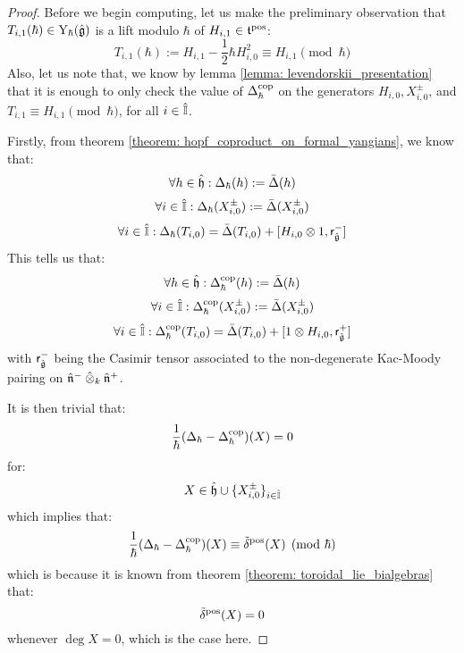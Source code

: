            \begin{proof}
                Before we begin computing, let us make the preliminary observation that $T_{i, 1}(\hbar) \in \mathrm{Y}_{\hbar}(\hat{\mathfrak{g}})$ is a lift modulo $\hbar$ of $H_{i, 1} \in \mathfrak{t}^{\mathrm{pos}}$:
                    $$T_{i, 1}(\hbar) := H_{i, 1} - \frac12 \hbar H_{i, 0}^2 \equiv H_{i, 1} \pmod{\hbar}$$
                Also, let us note that, we know by lemma \ref{lemma: levendorskii_presentation} that it is enough to only check the value of $\Delta_{\hbar}^{\mathrm{cop}}$ on the generators $H_{i, 0}, X_{i, 0}^{\pm}$, and $T_{i, 1} \equiv H_{i, 1} \pmod{\hbar}$, for all $i \in \hat{\mathbb{I}}$.
            
                Firstly, from theorem \ref{theorem: hopf_coproduct_on_formal_yangians}, we know that:
                    $$\forall h \in \hat{\mathfrak{h}}: \Delta_{\hbar}(h) := \bar{\Delta}(h)$$
                    $$\forall i \in \hat{\mathbb{I}}: \Delta_{\hbar}(X_{i, 0}^{\pm}) := \bar{\Delta}(X_{i, 0}^{\pm})$$
                    $$\forall i \in \hat{\simpleroots}: \Delta_{\hbar}(T_{i, 0}) = \bar{\Delta}(T_{i, 0}) + [H_{i, 0} \tensor 1, \sfr_{ \hat{\g} }^-]$$
                This tells us that:
                    $$\forall h \in \hat{\mathfrak{h}}: \Delta_{\hbar}^{\mathrm{cop}}(h) := \bar{\Delta}(h)$$
                    $$\forall i \in \hat{\mathbb{I}}: \Delta_{\hbar}^{\mathrm{cop}}(X_{i, 0}^{\pm}) := \bar{\Delta}(X_{i, 0}^{\pm})$$
                    $$\forall i \in \hat{\simpleroots}: \Delta_{\hbar}^{\cop}(T_{i, 0}) = \bar{\Delta}(T_{i, 0}) + [1 \tensor H_{i, 0}, \sfr_{ \hat{\g} }^+]$$
                with $\mathsf{r}_{\hat{\mathfrak{g}}}^-$ being the Casimir tensor associated to the non-degenerate Kac-Moody pairing on $\hat{\n}^- \hattensor_k \hat{\n}^+$.

                It is then trivial that:
                    $$\frac{1}{\hbar}( \Delta_{\hbar} - \Delta_{\hbar}^{\mathrm{cop}} )(X) = 0$$
                for:
                    $$X \in \hat{\mathfrak{h}} \cup \{X_{i, 0}^{\pm}\}_{i \in \hat{\mathbb{I}}}$$
                which implies that:
                    $$\frac{1}{\hbar}( \Delta_{\hbar} - \Delta_{\hbar}^{\mathrm{cop}} )(X) \equiv \tilde{\delta}^{\mathrm{pos}}(X) \pmod{\hbar}$$
                which is because it is known from theorem \ref{theorem: toroidal_lie_bialgebras} that:
                    $$\tilde{\delta}^{\mathrm{pos}}(X) = 0$$
                whenever $\deg X = 0$, which is the case here.
                

\end{proof}
